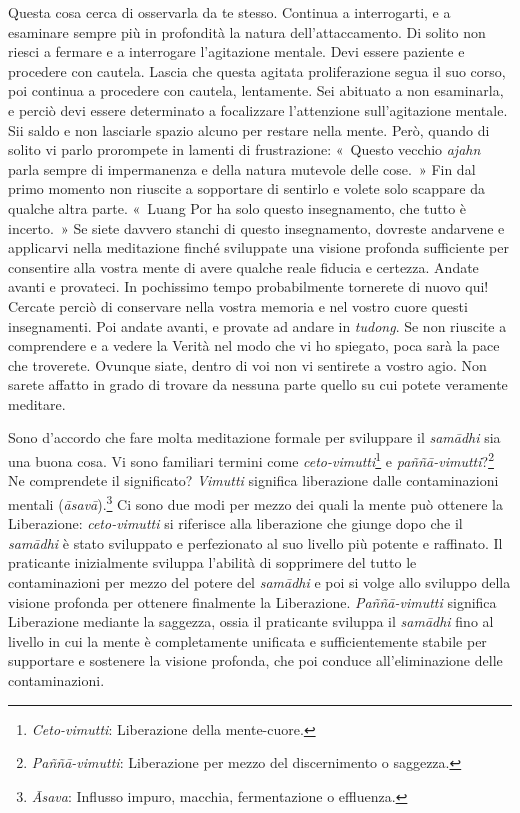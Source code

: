 Questa cosa cerca di osservarla da te stesso. Continua a interrogarti, e
a esaminare sempre più in profondità la natura dell'attaccamento. Di
solito non riesci a fermare e a interrogare l'agitazione mentale. Devi
essere paziente e procedere con cautela. Lascia che questa agitata
proliferazione segua il suo corso, poi continua a procedere con cautela,
lentamente. Sei abituato a non esaminarla, e perciò devi essere
determinato a focalizzare l'attenzione sull'agitazione mentale. Sii
saldo e non lasciarle spazio alcuno per restare nella mente. Però,
quando di solito vi parlo prorompete in lamenti di frustrazione:
«~Questo vecchio \emph{ajahn} parla sempre di impermanenza e della
natura mutevole delle cose.~» Fin dal primo momento non riuscite a
sopportare di sentirlo e volete solo scappare da qualche altra parte.
«~Luang Por ha solo questo insegnamento, che tutto è incerto.~» Se siete
davvero stanchi di questo insegnamento, dovreste andarvene e applicarvi
nella meditazione finché sviluppate una visione profonda sufficiente per
consentire alla vostra mente di avere qualche reale fiducia e certezza.
Andate avanti e provateci. In pochissimo tempo probabilmente tornerete
di nuovo qui! Cercate perciò di conservare nella vostra memoria e nel
vostro cuore questi insegnamenti. Poi andate avanti, e provate ad andare
in \emph{tudong}. Se non riuscite a comprendere e a vedere la Verità nel
modo che vi ho spiegato, poca sarà la pace che troverete. Ovunque siate,
dentro di voi non vi sentirete a vostro agio. Non sarete affatto in
grado di trovare da nessuna parte quello su cui potete veramente
meditare.

Sono d'accordo che fare molta meditazione formale per sviluppare il
\emph{samādhi} sia una buona cosa. Vi sono familiari termini come
\emph{ceto-vimutti}\footnote{\emph{Ceto-vimutti}: Liberazione della
  mente-cuore.} e \emph{paññā-vimutti}?\footnote{\emph{Paññā-vimutti}:
  Liberazione per mezzo del discernimento o saggezza.} Ne comprendete il
significato? \emph{Vimutti} significa liberazione dalle contaminazioni
mentali (\emph{āsavā}).\footnote{\emph{Āsava}: Influsso impuro, macchia,
  fermentazione o effluenza.} Ci sono due modi per mezzo dei quali la
mente può ottenere la Liberazione: \emph{ceto-vimutti} si riferisce alla
liberazione che giunge dopo che il \emph{samādhi} è stato sviluppato e
perfezionato al suo livello più potente e raffinato. Il praticante
inizialmente sviluppa l'abilità di sopprimere del tutto le
contaminazioni per mezzo del potere del \emph{samādhi} e poi si volge
allo sviluppo della visione profonda per ottenere finalmente la
Liberazione. \emph{Paññā-vimutti} significa Liberazione mediante la
saggezza, ossia il praticante sviluppa il \emph{samādhi} fino al livello
in cui la mente è completamente unificata e sufficientemente stabile per
supportare e sostenere la visione profonda, che poi conduce
all'eliminazione delle contaminazioni.

